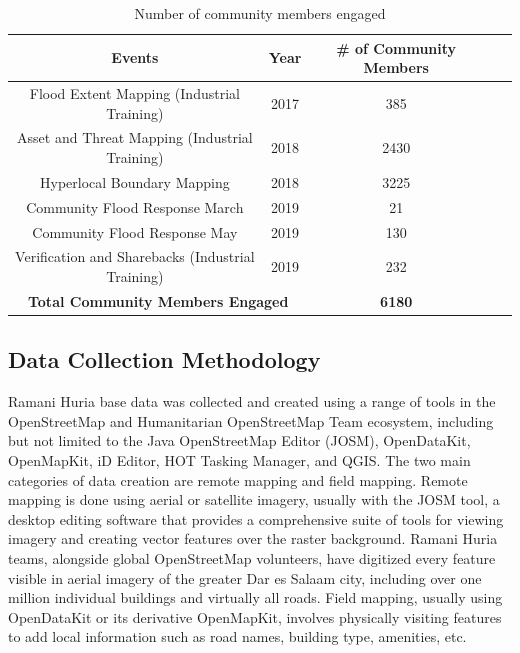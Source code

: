 \documentclass[a4paper,12pt,twoside]{article}
\begin{document}
\begin{table}[h]
\begin{tabular}{|c|c|c|c|c|}
	\hline
\bfseries Events & \bfseries Year & \bfseries \# of Community Members\\
	\hline
	Flood Extent Mapping (Industrial Training) & 2017 & 385\\
	\hline
	Asset and Threat Mapping (Industrial Training) & 2018 & 2430\\
	\hline
	Hyperlocal Boundary Mapping & 2018 & 3225\\
	\hline
	Community Flood Response March & 2019 & 21\\
	\hline
	Community Flood Response May & 2019 & 130\\
	\hline
	Verification and Sharebacks (Industrial Training) & 2019 & 232\\
	\hline	
\multicolumn{2}{|c|}{\bfseries Total Community Members Engaged} & \bfseries 6180 \\
\hline
\end{tabular}
\caption{\label{tab:table-name}Number of community members engaged}
\end{table}

\subsection{Data Collection Methodology}

\begin{multicols}{2}
Ramani Huria base data was collected and created using a range of tools in the OpenStreetMap and Humanitarian OpenStreetMap Team ecosystem, including but not limited to the Java OpenStreetMap Editor (JOSM), OpenDataKit, OpenMapKit, iD Editor, HOT Tasking Manager, and QGIS. 
The two main categories of data creation are remote mapping and field mapping. Remote mapping is done using aerial or satellite imagery, usually with the JOSM tool, a desktop editing software that provides a comprehensive suite of tools for viewing imagery and creating vector features over the raster background. Ramani Huria teams, alongside global OpenStreetMap volunteers, have digitized every feature visible in aerial imagery of the greater Dar es Salaam city, including over one million individual buildings and virtually all roads.
Field mapping, usually using OpenDataKit or its derivative OpenMapKit, involves physically visiting features to add local information such as road names, building type, amenities, etc.
\end{multicols}
\end{document}
